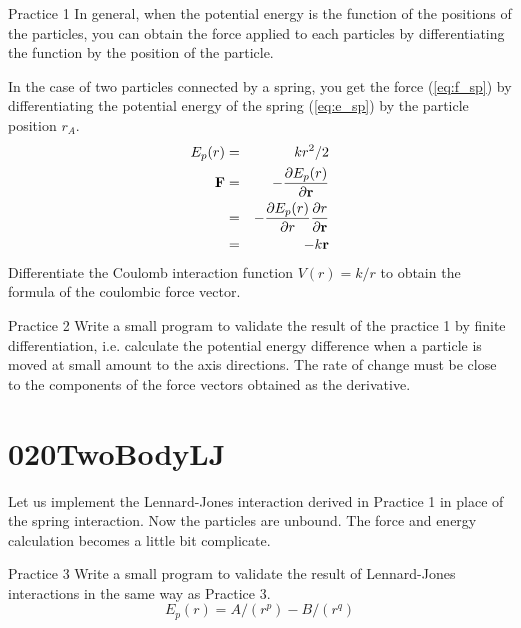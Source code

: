 \documentclass[a4,10pt]{article}
\begin{document}
\begin{itembox}[l]{Practice 1}
In general, when the potential energy is the function of
the positions of the particles, you can obtain the force applied to
each  particles by differentiating the function by the position of the
particle.

In the case of two particles connected by a spring, you get the force
(\ref{eq:f_sp}) by differentiating the potential energy of the spring
(\ref{eq:e_sp}) by the particle position $r_A$.
\begin{eqnarray}
E_p(r)&=&kr^2/2\\
{\bf F}&=&-\frac{\partial E_p(r)}{\partial {\bf r}}\\
&=&-\frac{\partial E_p(r)}{\partial r}\frac{\partial r}{\partial {\bf r}}\\
&=&-k{\bf r}
\end{eqnarray}
Differentiate the Coulomb interaction function $V(r) = k / r$ to
obtain the formula of the coulombic force vector.
\end{itembox}

\begin{itembox}[l]{Practice 2}
Write a small program to validate the result of the practice 1 by finite differentiation,
i.e. calculate the potential energy difference when a particle is
moved at small amount to the axis directions.  The rate of change must
be close to the components of the force vectors obtained as the derivative.
\end{itembox}

\section{020TwoBodyLJ}

Let us implement the Lennard-Jones interaction derived in Practice 1 in place of the spring interaction.  Now the particles are unbound.  The force and energy calculation becomes a little bit complicate.

\begin{itembox}[l]{Practice 3}
Write a small program to validate the result of Lennard-Jones interactions in the same way as Practice 3.
\begin{equation}
    E_p(r) = A/(r^p) - B/(r^q)
\end{equation}
\end{itembox}


\end{document}
